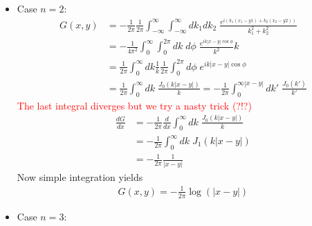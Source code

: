 \documentclass[10pt,a4paper]{article}
\theoremstyle{definition}
\begin{document}
\begin{enumerate}
\begin{itemize}
\begin{center}
        \end{center}
        \item Case $n=2$:
        \begin{align}
            G(x,y)&=-\frac{1}{2\pi}\frac{1}{2\pi}\int_{-\infty}^\infty \int_{-\infty}^\infty dk_1 dk_2\; \frac{e^{i(k_1(x_1-y1)+k_2(x_2-y2))}}{k_1^2+k_2^2}\\
            &=-\frac{1}{4\pi^2}\int_{0}^\infty \int_{0}^{2\pi} dk\;d\phi\; \frac{e^{ik |x-y|\cos\phi}}{k^2}k\\
            &=\frac{1}{2\pi}\int_{0}^\infty dk \frac{1}{k}\frac{1}{2\pi}\int_{0}^{2\pi} d\phi\; e^{ik |x-y|\cos\phi}\\
            &=\frac{1}{2\pi}\int_{0}^\infty dk \; \frac{J_0(k|x-y|)}{k}=-\frac{1}{2\pi}\int_{0}^{\infty|x-y|} dk' \; \frac{J_0(k')}{k'}
        \end{align}
        \textcolor{red}{The last integral diverges but we try a nasty trick (?!?)}
        \begin{align}
            \frac{dG}{dx}&=-\frac{1}{2\pi}\frac{d}{dx}\int_{0}^{\infty} dk \; \frac{J_0(k|x-y|)}{k}\\
            &=-\frac{1}{2\pi}\int_{0}^{\infty} dk \; J_1(k|x-y|)\\
            &=-\frac{1}{2\pi}\frac{1}{|x-y|}
        \end{align}
        Now simple integration yields
        \begin{align}
            G(x,y)=-\frac{1}{2\pi}\log(|x-y|)
        \end{align}
        \item Case $n=3$:
        \begin{align}

\end{align}
\end{itemize}
\end{enumerate}
\end{document}
